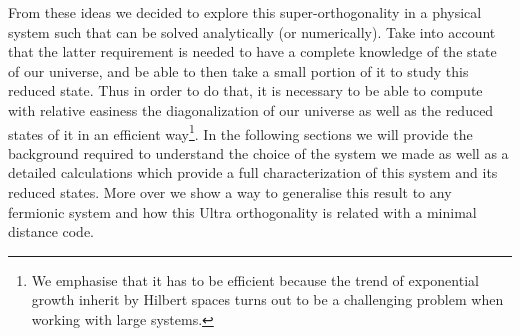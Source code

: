 From these ideas we decided to explore this super-orthogonality in a physical system such that can be solved analytically (or numerically). Take into account that the latter requirement is needed to have a complete knowledge of the state of our universe, and be able to then take a small portion of it to study this reduced state. Thus in order to do that, it is necessary to be able to compute with relative easiness the diagonalization of our universe as well as the reduced states of it in an efficient way\footnote{We emphasise that it has to be efficient because the trend of exponential growth inherit by Hilbert spaces turns out to be a challenging problem when working with large systems.}. In the following sections we will provide the background required to understand the choice of the system we made as well as a detailed calculations which provide a full characterization of this system and its reduced states. More over we show a way to generalise this result to any fermionic system and how this Ultra orthogonality is related with a minimal distance code.